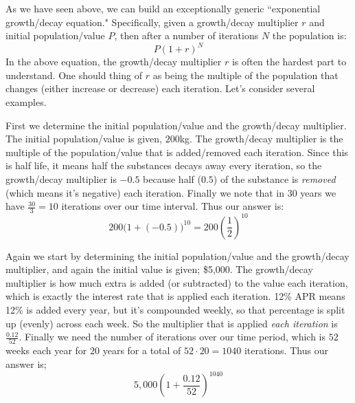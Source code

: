 \documentclass{ximeraXloud}
\begin{document}
        As we have seen above, we can build an exceptionally generic ``exponential growth/decay equation." Specifically, given a growth/decay multiplier $r$ and initial population/value $P$, then after a number of iterations $N$ the population is:
        \[
            P(1 + r)^N
        \]
        In the above equation, the growth/decay multiplier $r$ is often the hardest part to understand. One should thing of $r$ as being the multiple of the population that changes (either increase or decrease) each iteration. Let's consider several examples.
        
        \begin{explanation}%
            First we determine the initial population/value and the growth/decay multiplier. The initial population/value is given, $200$kg. The growth/decay multiplier is the multiple of the population/value that is added/removed each iteration. Since this is half life, it means half the substances decays away every iteration, so the growth/decay multiplier is $-0.5$ because half ($0.5$) of the substance is \textit{removed} (which means it's negative) each iteration. Finally we note that in $30$ years we have $\frac{30}{3} = 10$ iterations over our time interval. Thus our answer is:
            \[
                200\big(1 + (-0.5)\big)^{10} = 200\left(\frac{1}{2}\right)^{10}
            \]
        \end{explanation}%
            
        \begin{explanation}%
            Again we start by determining the initial population/value and the growth/decay multiplier, and again the initial value is given; \$5,000. The growth/decay multiplier is how much extra is added (or subtracted) to the value each iteration, which is exactly the interest rate that is applied each iteration. 12\% APR means 12\% is added every year, but it's compounded weekly, so that percentage is split up (evenly) across each week. So the multiplier that is applied \textit{each iteration} is $\frac{0.12}{52}$. Finally we need the number of iterations over our time period, which is $52$ weeks each year for $20$ years for a total of $52 \cdot 20 = 1040$ iterations. Thus our answer is;
            \[
                5,000\left(1 + \frac{0.12}{52}\right)^{1040}
            \]
            
        \end{explanation}%
        
\end{document}
